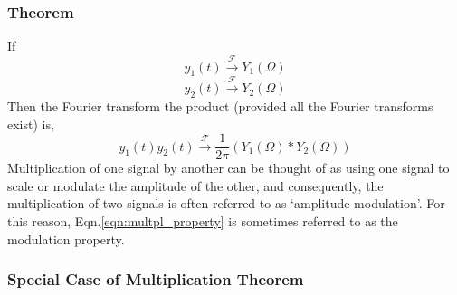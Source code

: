 	\subsubsection*{Theorem}
		If 
		\begin{equation*}
			y_1(t) \xrightarrow{\mathcal{F}} Y_1(\Omega)
		\end{equation*}
		\begin{equation*}
			y_2(t)
			\xrightarrow{\mathcal{F}}
			Y_2(\Omega)
		\end{equation*}
		Then the Fourier transform the product (provided all the Fourier transforms exist) is,
		\begin{equation}\label{eqn:multpl_property}
			y_1(t)y_2(t) 
			\xrightarrow{\mathcal{F}}
			\frac{1}{2\pi} 
			( Y_1(\Omega) \ast Y_2(\Omega) )
		\end{equation}
		Multiplication of one signal by another can be thought of as using one signal to scale or modulate the amplitude of the other, and consequently, the multiplication of two signals is often referred to as `amplitude modulation'. For this reason, Eqn.\ref{eqn:multpl_property} is sometimes referred to as the modulation property.
	\subsubsection*{Special Case of Multiplication Theorem}

